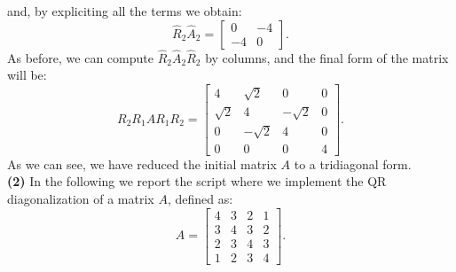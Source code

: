 \documentclass[a4paper,11pt]{article}
\begin{document}
and, by expliciting all the terms we obtain:
\begin{equation}\label{key}
	\hat{R}_2 \hat{A}_2 = \left[ \begin{array}{cc}
		0 & -4 \\
		-4 & 0
	\end{array}\right].
\end{equation}
As before, we can compute $\hat{R}_2 \hat{A}_2 \hat{R}_2$ by columns, and the final form of the matrix will be:
\begin{equation}\label{key}
	R_2R_1AR_1R_2 =\begin{bmatrix}
		4& \sqrt{2} & 0  &  0\\
		\sqrt{2}&4 & -\sqrt{2} & 0\\
		0 & -\sqrt{2} & 4  & 0 \\
		0 & 0 & 0 & 4
	\end{bmatrix}.
\end{equation}
As we can see, we have reduced the initial matrix $A$ to a tridiagonal form.\\

\noindent \textbf{(2)} In the following we report the script where we implement the QR diagonalization of a matrix $A$, defined as:
\begin{equation}
	A = \begin{bmatrix}
		4 & 3 & 2 & 1 \\
		3 & 4 & 3 & 2 \\
		2 & 3 & 4 & 3 \\
		1 & 2 & 3 & 4
	\end{bmatrix}.
\end{equation}
\end{document}
